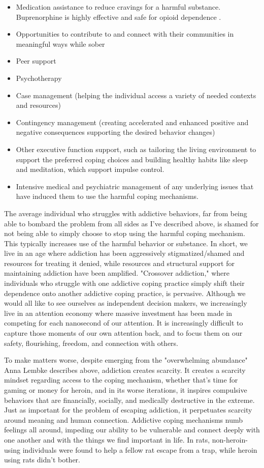 \documentclass[12pt,letterpaper]{book}
\begin{document}
\begin{itemize}
    \item Medication assistance to reduce cravings for a harmful substance. Buprenorphine is highly effective and safe for opioid dependence \cite{Mattickbuprenorphine}.
    \item Opportunities to contribute to and connect with their communities in meaningful ways while sober
    \item Peer support
    \item Psychotherapy
    \item Case management (helping the individual access a variety of needed contexts and resources)
    \item Contingency management (creating accelerated and enhanced positive and negative consequences supporting the desired behavior changes)
    \item Other executive function support, such as tailoring the living environment to support the preferred coping choices and building healthy habits like sleep and meditation, which support impulse control.
    \item Intensive medical and psychiatric management of any underlying issues that have induced them to use the harmful coping mechanisms.
\end{itemize}

The average individual who struggles with addictive behaviors, far from being able to bombard the problem from all sides as I've described above, is shamed for not being able to simply choose to stop using the harmful coping mechanism. This typically increases use of the harmful behavior or substance. In short, we live in an age where addiction has been aggressively stigmatized/shamed and resources for treating it denied, while resources and structural support for maintaining addiction have been amplified. "Crossover addiction," where individuals who struggle with one addictive coping practice simply shift their dependence onto another addictive coping practice, is pervasive. Although we would all like to see ourselves as independent decision makers, we increasingly live in an attention economy where massive investment has been made in competing for each nanosecond of our attention. It is increasingly difficult to capture those moments of our own attention back, and to focus them on our safety, flourishing, freedom, and connection with others.

To make matters worse, despite emerging from the "overwhelming abundance" Anna Lembke describes above, addiction creates scarcity. It creates a scarcity mindset regarding access to the coping mechanism, whether that's time for gaming or money for heroin, and in its worse iterations, it inspires compulsive behaviors that are financially, socially, and medically destructive in the extreme. Just as important for the problem of escaping addiction, it perpetuates scarcity around meaning and human connection. Addictive coping mechanisms numb feelings all around, impeding our ability to be vulnerable and connect deeply with one another and with the things we find important in life. In rats, non-heroin-using individuals were found to help a fellow rat escape from a trap, while heroin using rats didn't bother.
\end{document}
